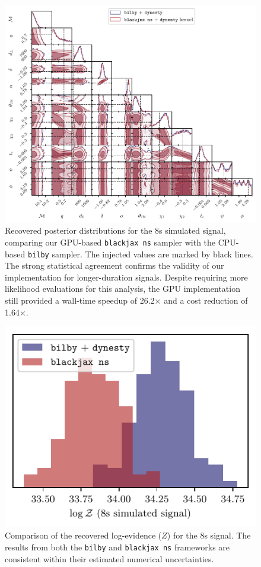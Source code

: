\documentclass[fleqn,usenatbib]{mnras}
\begin{document}
\begin{figure}
    \centering
    \includegraphics{figures/8s_corner_comparison.pdf}
    \caption{Recovered posterior distributions for the 8s simulated
    signal, comparing our GPU-based \texttt{blackjax ns} sampler
    with the CPU-based \texttt{bilby} sampler. The injected values
    are marked by black lines. The strong statistical agreement confirms
    the validity of our implementation for longer-duration signals.
    Despite requiring more likelihood evaluations for this analysis, the
    GPU implementation still provided a wall-time speedup of
    26.2$\times$ and a cost reduction of 1.64$\times$.}
    \label{fig:8s_posteriors}
\end{figure}

\begin{figure}
    \centering
    \includegraphics{figures/8s_logZ_comparison.pdf}
    \caption{Comparison of the recovered log-evidence ($Z$) for the 8s
    signal. The results from both the \texttt{bilby} and
    \texttt{blackjax ns} frameworks are consistent within their
    estimated numerical uncertainties.}
    \label{fig:8s_logZ}
\end{figure}
\end{document}
